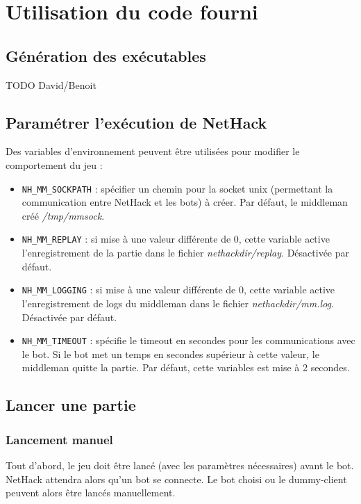 \documentclass[10pt,a4paper]{report}
\begin{document}
\tableofcontents

\chapter{Utilisation du code fourni}
\section{Génération des exécutables}
TODO David/Benoit


\section{Paramétrer l'exécution de NetHack}

Des variables d'environnement peuvent être utilisées pour modifier le
comportement du jeu :

\begin{itemize}
	\item \verb!NH_MM_SOCKPATH! : spécifier un chemin pour la socket unix (permettant la communication entre NetHack et les bots) à créer. Par défaut, le middleman créé \emph{/tmp/mmsock}.
	\item \verb!NH_MM_REPLAY! : si mise à une valeur différente de 0, cette variable active l'enregistrement de la partie dans le fichier \emph{nethackdir/replay}. Désactivée par défaut.
	\item \verb!NH_MM_LOGGING! : si mise à une valeur différente de 0, cette variable active l'enregistrement de logs du middleman dans le fichier \emph{nethackdir/mm.log}. Désactivée par défaut.
	\item \verb!NH_MM_TIMEOUT! : spécifie le timeout en secondes pour les communications avec le bot. Si le bot met un temps en secondes supérieur à cette valeur, le middleman quitte la partie. Par défaut, cette variables est mise à 2 secondes.
\end{itemize}

\section{Lancer une partie}

\subsection{Lancement manuel}

Tout d'abord, le jeu doit être lancé (avec les paramètres nécessaires) avant le bot. NetHack attendra alors qu'un bot se connecte. Le bot choisi ou le dummy-client peuvent alors être lancés manuellement.
\end{document}
